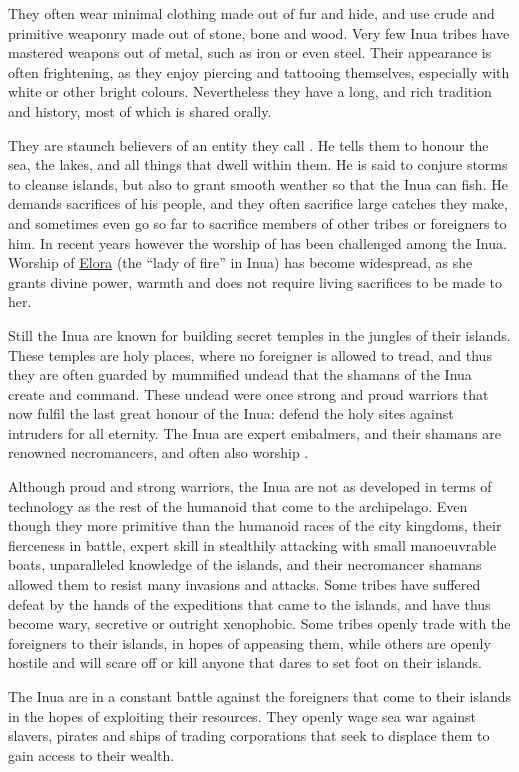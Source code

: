 They often wear minimal clothing made out of fur and hide, and use crude and
primitive weaponry made out of stone, bone and wood. Very few Inua tribes have
mastered weapons out of metal, such as iron or even steel. Their appearance is
often frightening, as they enjoy piercing and tattooing themselves, especially
with white or other bright colours. Nevertheless they have a long, and rich
tradition and history, most of which is shared orally.

They are staunch believers of an entity they call .
He tells them to honour the sea, the lakes, and all things that dwell within
them. He is said to conjure storms to cleanse islands, but also to grant
smooth weather so that the Inua can fish. He demands sacrifices of his people,
and they often sacrifice large catches they make, and sometimes even go so
far to sacrifice members of other tribes or foreigners to him. In recent years
however the worship of  has been challenged among the
Inua. Worship of \hyperref[sec:Forun]{Elora} (the ``lady of fire'' in Inua)
has become widespread, as she grants divine power, warmth and does not require
living sacrifices to be made to her.

Still the Inua are known for building secret temples in the jungles of their
islands. These temples are holy places, where no foreigner is allowed to
tread, and thus they are often guarded by mummified undead that the shamans of
the Inua create and command. These undead were once strong and proud warriors
that now fulfil the last great honour of the Inua: defend the holy sites
against intruders for all eternity. The Inua are expert embalmers, and their
shamans are renowned necromancers, and often also worship .

Although proud and strong warriors, the Inua are not as developed in terms of
technology as the rest of the humanoid that come to the archipelago. Even
though they more primitive than the humanoid races of the city kingdoms, their
fierceness in battle, expert skill in stealthily attacking with small
manoeuvrable boats, unparalleled knowledge of the islands, and their
necromancer shamans allowed them to resist many invasions and attacks. Some
tribes have suffered defeat by the hands of the expeditions that came to the
islands, and have thus become wary, secretive or outright xenophobic. Some
tribes openly trade with the foreigners to their islands, in hopes of
appeasing them, while others are openly hostile and will scare off or kill
anyone that dares to set foot on their islands.

The Inua are in a constant battle against the foreigners that come to their
islands in the hopes of exploiting their resources. They openly wage sea
war against slavers, pirates and ships of trading corporations that seek
to displace them to gain access to their wealth.
